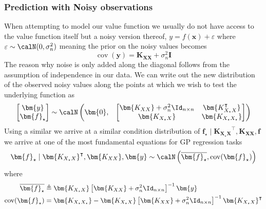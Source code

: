 \subsubsection{Prediction with Noisy observations}\label{Section1.5.2}
When attempting to model our value function we usually do not have access to the value function itself but a noisy version thereof, $y = f(\bm{x}) + \varepsilon$ where $\varepsilon \sim \calN (0, \sigma_n^2)$ meaning the prior on the noisy values becomes
\[
    \operatorname{cov} (\bm{y}) = \bm{K_{XX}} + \sigma_n^2 \bm{I}
\]
The reason why noise is only added along the diagonal follows from the assumption of independence in our data.
We can write out the new distribution of the observed noisy values along the points at which we wish to test the underlying function as
\[
    \begin{bmatrix}
        \bm{y} \\
        \bm{f}_{\star}
    \end{bmatrix}
    \sim \calN
    \begin{pmatrix}
        \bm{0}, &
        {
                \begin{bmatrix}
                    \bm{K_{XX}} + \sigma_n^2 \Id_{n \times n} & \bm{K_{X_{\star}X}^{\intercal}} \\
                    \bm{K_{X_{\star}X}}                       & \bm{K_{X_{\star}X_{\star}}}
                \end{bmatrix}
            }
    \end{pmatrix}
\]
Using a similar we arrive at a similar condition distribution of $\bm{f}_{\star} \mid \bm{K_{X_{\star}X}}^{\intercal} , \bm{K_{XX}}, \bm{f}$ we arrive at one of the most fundamental equations for GP regression tasks
\begin{equation}\label{prop:GP_train_distr2}
    \bm{f}_{\star} \mid \bm{K_{X_{\star}X}}^{\intercal} , \bm{K_{XX}}, \bm{y} \sim \calN \left( \overline{\bm{f}_{\star}}, \operatorname{cov} (\bm{f}_{\star}) \right)
\end{equation}
where
\begin{align}
    \overline{\bm{f}_{\star}}           & \triangleq \bm{K_{X_{\star} X}} \left[ \bm{K_{XX}} + \sigma_n^2 \Id_{n \times n} \right]^{-1} \bm{y} \label{eq: GP_train_distr2_mean}                                               \\
    \operatorname{cov} (\bm{f}_{\star}) & = \bm{K_{X_{\star}X_{\star}}} - \bm{K_{X_{\star}X}} \left[ \bm{K_{XX}} + \sigma_n^2 \Id_{n \times n} \right]^{-1} \bm{K_{X_{\star}X}}^{\intercal} \label{eq: GP_train_distr2_var}
\end{align}
